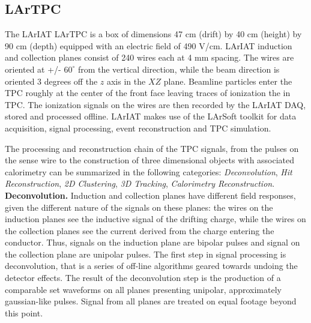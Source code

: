 \documentclass[aps,prl,twocolumn,showpacs,superscriptaddress,groupedaddress]{revtex4}  %
\begin{document}
\subsection{\label{sec:LArTPC}LArTPC}

The LArIAT LArTPC is a box of dimensions 47 cm (drift) by 40 cm (height) by 90 cm (depth) equipped with an  electric field of 490 V/cm. LArIAT induction and collection planes consist of 240 wires each at 4 mm spacing. The wires are oriented at +/- $60^{\circ}$ from the vertical direction, while the beam direction is oriented 3 degrees off the $z$ axis in the $XZ$ plane.   Beamline particles enter the TPC roughly at the center of the front face leaving traces of ionization the in TPC. The ionization signals on the wires are then recorded by the LArIAT DAQ, stored and processed offline. LArIAT makes use of the LArSoft toolkit \cite{EricFChurck} for data acquisition, signal processing, event reconstruction and TPC simulation. 

The processing and reconstruction chain of the TPC signals, from the pulses on the sense wire to the construction of three dimensional objects with associated calorimetry can be summarized in the following categories: \emph{Deconvolution}, \emph{Hit Reconstruction}, \emph{2D Clustering}, \emph{3D Tracking}, \emph{Calorimetry Reconstruction}. \\ %


\textbf{Deconvolution.} Induction and collection planes have different field responses, given the different nature of the signals on these planes: the wires on the induction planes see the inductive signal of the drifting charge, while the wires on the collection planes see the current derived from the charge entering the conductor. Thus, signals on the induction plane are bipolar pulses and signal on the collection plane are unipolar pulses. %
The first step in signal processing is deconvolution, that is a series of off-line algorithms geared towards undoing the detector effects. The result of the deconvolution step is  the production of  a comparable set waveforms on all planes presenting unipolar, approximately gaussian-like pulses. %
Signal from all planes are treated on equal footage beyond this point.\\
\end{document}
